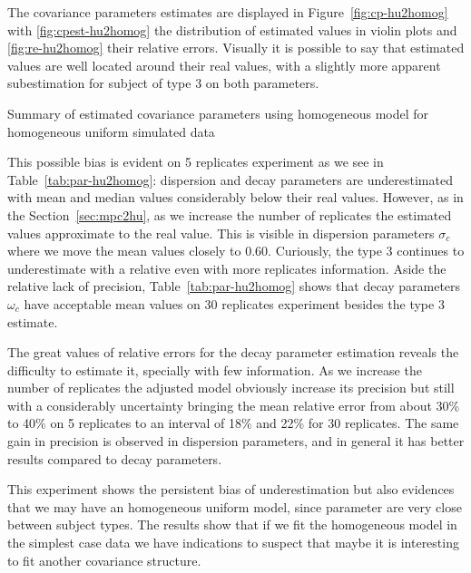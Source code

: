 The covariance parameters estimates are displayed in Figure~\ref{fig:cp-hu2homog} with \ref{fig:cpest-hu2homog} the distribution of estimated values in violin plots and \ref{fig:re-hu2homog} their relative errors. Visually it is possible to say that estimated values are well located around their real values, with a slightly more apparent subestimation for subject of type 3 on both parameters.


\begin{table}[b]\centering
\caption{Summary of estimated covariance parameters using homogeneous  model for homogeneous uniform simulated data}
\begin{knitrout}
\color{fgcolor}\begin{kframe}


{\ttfamily\noindent\bfseries\color{errorcolor}{\#\# Error in eval(lhs, parent, parent): object 'cp' not found}}\end{kframe}
\end{knitrout}
\label{tab:par-hu2homog}
\end{table}

This possible bias is evident on 5 replicates experiment as we see in Table~\ref{tab:par-hu2homog}: dispersion and  decay parameters are underestimated with mean and median values considerably below their real values. However, as in the Section~\ref{sec:mpc2hu}, as we increase the number of replicates the estimated values approximate to the real value. This is visible in dispersion parameters $\sigma_c$ where we move the mean values closely to 0.60. Curiously, the type 3 continues to underestimate with a relative even with more replicates information. Aside the relative lack of precision, Table~\ref{tab:par-hu2homog} shows that decay parameters $\omega_c$ have acceptable mean values on 30 replicates experiment besides the type 3 estimate.

The great values of relative errors for the decay parameter estimation reveals the difficulty to estimate it, specially with few information. As we increase the number of replicates the adjusted model obviously increase its precision but still with a considerably uncertainty bringing the mean relative error from about 30\% to 40\% on 5 replicates to an interval of 18\% and 22\% for 30 replicates. The same gain in precision is observed in dispersion parameters, and in general it has better results compared to decay parameters.

This experiment shows the persistent bias of underestimation but also evidences that we may have an homogeneous uniform model, since parameter are very close between subject types. The results show that if we fit the homogeneous model in the simplest case data we have indications to suspect that maybe it is interesting to fit another  covariance structure.





